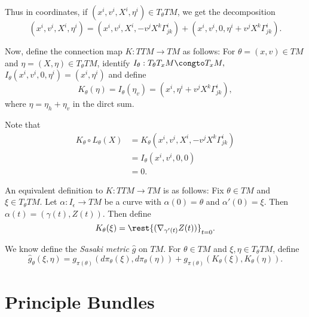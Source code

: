 Thus in coordinates, if $(x^i,v^i,X^i,\eta^i)\in T_\theta TM$, we get the decomposition
$$(x^i,v^i,X^i,\eta^i)=(x^i, v^i, X^i, -v^jX^k\Gamma_{jk}^i)+(x^i, v^i,0, \eta^i+v^jX^k\Gamma_{jk}^i).$$

Now, define the connection map $K:TTM\to TM$ as follows:  For $\theta=(x,v)\in TM$ and $\eta=(X,\eta)\in T_\theta TM$, identify $I_\theta:T_\theta T_xM \congto T_xM,$ $ I_\theta(x^i,v^i,0,\eta^i)=(x^i,\eta^i)$ and define
$$K_\theta(\eta)=I_\theta(\eta_v)=(x^i,\eta^i+v^jX^k\Gamma_{jk}^i),$$
where $\eta=\eta_h+\eta_v$ in the dirct sum.  

Note that
\begin{align*}
K_\theta\circ L_\theta(X)&=K_\theta(x^i, v^i, X^i, -v^jX^k\Gamma_{jk}^i)\\
&=I_\theta(x^i,v^i,0,0)\\
&=0.
\end{align*}

An equivalent definition to $K:TTM\to TM$ is as follows:  Fix $\theta\in TM$ and $\xi\in T_\theta TM$.  Let $\alpha:I_\epsilon\to TM$ be a curve with $\alpha(0)=\theta$ and $\alpha'(0)=\xi$.  Then $\alpha(t)=(\gamma(t),Z(t))$.  Then define
$$K_\theta(\xi)=\rest{(\nabla_{\gamma'(t)}Z(t))}_{t=0}.$$

We know define the \textit{Sasaki metric} $\hat{g}$ on $TM$.  For $\theta\in TM$ and $\xi,\eta\in T_\theta TM$, define
$$\hat{g}_\theta(\xi,\eta)=g_{\pi(\theta)}(d\pi_\theta(\xi),d\pi_\theta(\eta))+g_{\pi(\theta)}(K_\theta(\xi),K_\theta(\eta)).$$
























\section{Principle Bundles}










